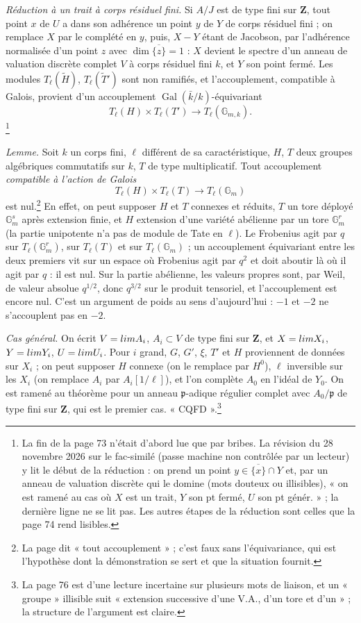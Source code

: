 \documentclass[11pt,a4paper]{article}
\begin{document}
\emph{Réduction à un trait à corps résiduel fini.} Si $A/J$ est de type fini sur
$\mathbf{Z}$, tout point $x$ de $U$ a dans son adhérence un point $y$ de $Y$ de
corps résiduel fini ; on remplace $X$ par le complété en $y$, puis, $X - Y$ étant
de Jacobson, par l'adhérence normalisée d'un point $z$ avec
$\dim\overline{\{z\}} = 1$ : $X$ devient le spectre d'un anneau de valuation
discrète complet $V$ à corps résiduel fini $k$, et $Y$ son point fermé. Les
modules $T_\ell(\tilde H)$, $T_\ell(\tilde T')$ sont non ramifiés, et
l'accouplement, compatible à Galois, provient d'un accouplement
$\operatorname{Gal}(\bar k/k)$-équivariant
\[ T_\ell(H) \times T_\ell(T') \to T_\ell(\mathbb{G}_{m,k}). \]\footnote{La fin de la
page 73 n'était d'abord lue que par bribes. La révision du 28 novembre 2026
sur le fac-similé (passe machine non contrôlée par un lecteur) y lit le début
de la réduction : on prend un point $y \in \overline{\{x\}} \cap Y$ et, par un
anneau de valuation discrète qui le domine (mots douteux ou illisibles), « on
est ramené au cas où $X$ est un trait, $Y$ son pt fermé, $U$ son pt génér. » ;
la dernière ligne ne se lit pas. Les autres étapes de la réduction sont celles
que la page 74 rend lisibles.}

\emph{Lemme.} Soit $k$ un corps fini, $\ell$ différent de sa caractéristique,
$H$, $T$ deux groupes algébriques commutatifs sur $k$, $T$ de type multiplicatif.
Tout accouplement \emph{compatible à l'action de Galois}
\[ T_\ell(H) \times T_\ell(T) \to T_\ell(\mathbb{G}_m) \]
est nul.\footnote{La page dit « tout accouplement » ; c'est faux sans
l'équivariance, qui est l'hypothèse dont la démonstration se sert et que la
situation fournit.} En effet, on peut supposer $H$ et $T$ connexes et réduits, $T$
un tore déployé $\mathbb{G}_m^s$ après extension finie, et $H$ extension d'une
variété abélienne par un tore $\mathbb{G}_m^r$ (la partie unipotente n'a pas de
module de Tate en $\ell$). Le Frobenius agit par $q$ sur $T_\ell(\mathbb{G}_m^r)$,
sur $T_\ell(T)$ et sur $T_\ell(\mathbb{G}_m)$ ; un accouplement équivariant entre
les deux premiers vit sur un espace où Frobenius agit par $q^2$ et doit aboutir
là où il agit par $q$ : il est nul. Sur la partie abélienne, les valeurs propres
sont, par Weil, de valeur absolue $q^{1/2}$, donc $q^{3/2}$ sur le produit
tensoriel, et l'accouplement est encore nul. C'est un argument de poids au sens
d'aujourd'hui : $-1$ et $-2$ ne s'accouplent pas en $-2$.

\emph{Cas général.} On écrit $V = \varinjlim A_i$, $A_i \subset V$ de type fini sur
$\mathbf{Z}$, et $X = \varprojlim X_i$, $Y = \varprojlim Y_i$, $U = \varprojlim
U_i$. Pour $i$ grand, $G$, $G'$, $\xi$, $T'$ et $H$ proviennent de données sur
$X_i$ ; on peut supposer $H$ connexe (on le remplace par $H^0$), $\ell$ inversible
sur les $X_i$ (on remplace $A_i$ par $A_i[1/\ell]$), et l'on complète $A_0$ en
l'idéal de $Y_0$. On est ramené au théorème pour un anneau $\mathfrak{p}$-adique
régulier complet avec $A_0/\mathfrak{p}$ de type fini sur $\mathbf{Z}$, qui est le
premier cas. « CQFD ».\footnote{La page 76 est d'une lecture incertaine sur
plusieurs mots de liaison, et un « groupe » illisible suit « extension successive
d'une V.A., d'un tore et d'un » ; la structure de l'argument est claire.}
\end{document}
